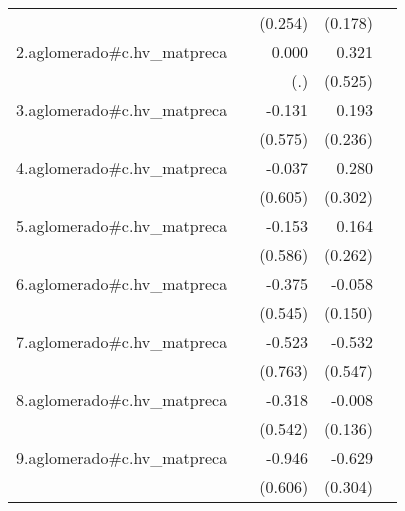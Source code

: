 {\begin{longtable}{l*{4}{D{.}{.}{-1}}}
            &                     &     (0.254)         &     (0.178)         &                     \\
\addlinespace
2.aglomerado#c.hv\_matpreca&                     &       0.000         &       0.321         &                     \\
            &                     &         (.)         &     (0.525)         &                     \\
\addlinespace
3.aglomerado#c.hv\_matpreca&                     &      -0.131         &       0.193         &                     \\
            &                     &     (0.575)         &     (0.236)         &                     \\
\addlinespace
4.aglomerado#c.hv\_matpreca&                     &      -0.037         &       0.280         &                     \\
            &                     &     (0.605)         &     (0.302)         &                     \\
\addlinespace
5.aglomerado#c.hv\_matpreca&                     &      -0.153         &       0.164         &                     \\
            &                     &     (0.586)         &     (0.262)         &                     \\
\addlinespace
6.aglomerado#c.hv\_matpreca&                     &      -0.375         &      -0.058         &                     \\
            &                     &     (0.545)         &     (0.150)         &                     \\
\addlinespace
7.aglomerado#c.hv\_matpreca&                     &      -0.523         &      -0.532         &                     \\
            &                     &     (0.763)         &     (0.547)         &                     \\
\addlinespace
8.aglomerado#c.hv\_matpreca&                     &      -0.318         &      -0.008         &                     \\
            &                     &     (0.542)         &     (0.136)         &                     \\
\addlinespace
9.aglomerado#c.hv\_matpreca&                     &      -0.946         &      -0.629\sym{*}  &                     \\
            &                     &     (0.606)         &     (0.304)         &                     \\

\end{longtable}}
